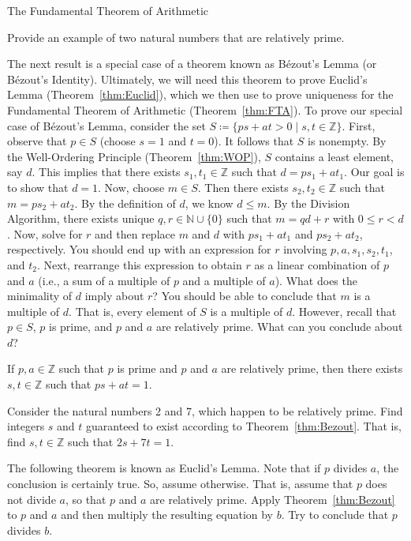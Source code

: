 \begin{section}{The Fundamental Theorem of Arithmetic}
\begin{problem}
Provide an example of two natural numbers that are relatively prime.
\end{problem}

The next result is a special case of a theorem known as B\'ezout's Lemma (or B\'ezout's Identity). Ultimately, we will need this theorem to prove Euclid's Lemma (Theorem~\ref{thm:Euclid}), which we then use to prove uniqueness for the Fundamental Theorem of Arithmetic (Theorem~\ref{thm:FTA}). To prove our special case of B\'ezout's Lemma, consider the set $S\coloneqq \{ps+at> 0\mid s,t\in \mathbb{Z}\}$. First, observe that $p\in S$ (choose $s=1$ and $t=0$). It follows that $S$ is nonempty. By the Well-Ordering Principle (Theorem~\ref{thm:WOP}), $S$ contains a least element, say $d$. This implies that there exists $s_1,t_1\in \mathbb{Z}$ such that $d=ps_1+at_1$. Our goal is to show that $d=1$. Now, choose $m\in S$. Then there exists $s_2,t_2\in \mathbb{Z}$ such that $m=ps_2+at_2$. By the definition of $d$, we know $d\leq m$. By the Division Algorithm, there exists unique $q,r\in \mathbb{N}\cup\{0\}$ such that $m=qd+r$ with $0\leq r < d$. Now, solve for $r$ and then replace $m$ and $d$ with $ps_1+at_1$ and $ps_2+at_2$, respectively.  You should end up with an expression for $r$ involving $p, a, s_1, s_2, t_1$, and $t_2$.  Next, rearrange this expression to obtain $r$ as a linear combination of $p$ and $a$ (i.e., a sum of a multiple of $p$ and a multiple of $a$). What does the minimality of $d$ imply about $r$?  You should be able to conclude that $m$ is a multiple of $d$.  That is, every element of $S$ is a multiple of $d$.  However, recall that $p\in S$, $p$ is prime, and $p$ and $a$ are relatively prime.  What can you conclude about $d$?

\begin{theorem}\label{thm:Bezout}
If $p,a\in\mathbb{Z}$ such that $p$ is prime and $p$ and $a$ are relatively prime, then there exists $s,t\in\mathbb{Z}$ such that $ps+at=1$.
\end{theorem}

\begin{problem}
Consider the natural numbers 2 and 7, which happen to be relatively prime.  Find integers $s$ and $t$ guaranteed to exist according to Theorem~\ref{thm:Bezout}.  That is, find $s,t\in\mathbb{Z}$ such that $2s+7t=1$.
\end{problem}

The following theorem is known as Euclid's Lemma. Note that if $p$ divides $a$, the conclusion is certainly true.  So, assume otherwise.  That is, assume that $p$ does not divide $a$, so that $p$ and $a$ are relatively prime.  Apply Theorem~\ref{thm:Bezout} to $p$ and $a$ and then multiply the resulting equation by $b$. Try to conclude that $p$ divides $b$.


\end{section}
